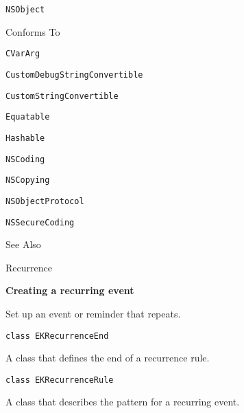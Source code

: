 \documentclass{article}
\begin{document}
\texttt{NSObject}

Conforms To

\texttt{CVarArg}

\texttt{CustomDebugStringConvertible}

\texttt{CustomStringConvertible}

\texttt{Equatable}

\texttt{Hashable}

\texttt{NSCoding}

\texttt{NSCopying}

\texttt{NSObjectProtocol}

\texttt{NSSecureCoding}

See Also

Recurrence

\textbf{Creating a recurring event}

Set up an event or reminder that repeats.

\texttt{class EKRecurrenceEnd}

A class that defines the end of a recurrence rule.

\texttt{class EKRecurrenceRule}

A class that describes the pattern for a recurring event.

\newpage
\end{document}
